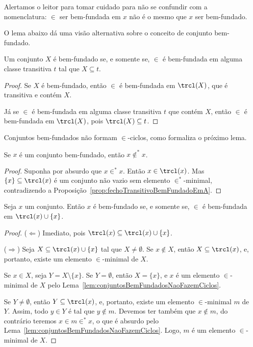 Alertamos o leitor para tomar cuidado para não se confundir com a nomenclatura:
$\in$ ser bem-fundada em $x$ não é o mesmo que $x$ ser bem-fundado.

O lema abaixo dá uma visão alternativa sobre o conceito de conjunto bem-fundado.

\begin{lemma}[$\ZFmP$]
    Um conjunto $X$ é bem-fundado se, e somente se, $\in$ é bem-fundada em alguma classe transitiva $t$ tal que $X\subseteq t$.
\end{lemma}
\begin{proof}
    Se $X$ é bem-fundado, então $\in$ é bem-fundada em $\trcl(X)$, que é transitiva e contém $X$.

    Já se $\in$ é bem-fundada em alguma classe transitiva $t$ que contém $X$, então $\in$ é bem-fundada em $\trcl(X)$, pois $\trcl(X)\subseteq t$.
\end{proof}

Conjuntos bem-fundados não formam $\in$-ciclos, como formaliza o próximo lema.

\begin{lemma}[$\ZFmP$]\label{lem:conjuntosBemFundadosNaoFazemCiclos}
    Se $x$ é um conjunto bem-fundado, então $x\notin^* x$.
\end{lemma}
\begin{proof}
    Suponha por absurdo que $x\in^* x$.
    Então $x \in \trcl(x)$.
    Mas $\{x\}\subseteq \trcl(x)$ é um conjunto não vazio sem elemento $\in^*$-minimal, contradizendo a Proposição~\ref{prop:fechoTransitivoBemFundadoEmA}.
\end{proof}

\begin{lemma}[$\ZFmP$]
    Seja $x$ um conjunto.
    Então $x$ é bem-fundado se, e somente se, $\in$ é bem-fundada em $\trcl(x)\cup\{x\}$.
\end{lemma}
\begin{proof}
    ($\Leftarrow$) Imediato, pois $\trcl(x)\subseteq \trcl(x)\cup\{x\}$.

    ($\Rightarrow$) Seja $X\subseteq \trcl(x)\cup\{x\}$ tal que $X\neq\emptyset$.
    Se $x\notin X$, então $X\subseteq \trcl(x)$, e, portanto, existe um elemento $\in$-minimal de $X$.

    Se $x\in X$, seja $Y=X\setminus\{x\}$.
    Se $Y=\emptyset$, então $X=\{x\}$, e $x$ é um elemento $\in$-minimal de $X$ pelo Lema~\ref{lem:conjuntosBemFundadosNaoFazemCiclos}.

    Se $Y\neq\emptyset$, então $Y\subseteq \trcl(x)$, e, portanto, existe um elemento $\in$-minimal $m$ de $Y$.
    Assim, todo $y\in Y$ é tal que $y\notin m$.
    Devemos ter também que $x\notin m$, do contrário teremos $x\in m\in^* x$, o que é absurdo pelo Lema~\ref{lem:conjuntosBemFundadosNaoFazemCiclos}.
    Logo, $m$ é um elemento $\in$-minimal de $X$.
\end{proof}

